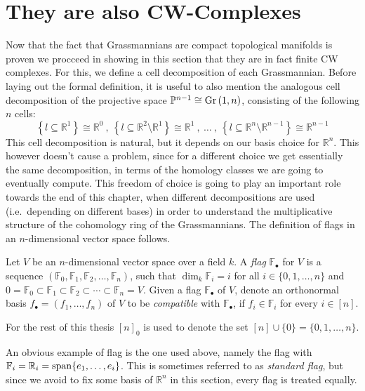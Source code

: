 \section{They are also CW-Complexes}
Now that the fact that Grassmannians are compact topological manifolds is proven we procceed in showing in this section that they are in fact finite CW complexes.
For this, we define a cell decomposition of each Grassmannian. Before laying out the formal definition, it is useful to also mention the analogous cell decomposition of the projective space $\mathbb{P}^{n-1}\cong\Gr{1}{n}$, consisting of the following $n$ cells:
\[\left\{l\subseteq\mathbb{R}^1\right\}\cong\mathbb{R}^0\ ,\ \left\{l\subseteq\mathbb{R}^2\setminus\mathbb{R}^1\right\}\cong\mathbb{R}^1\ ,\ \ldots\ ,\ \left\{l\subseteq\mathbb{R}^n\setminus\mathbb{R}^{n-1}\right\}\cong\mathbb{R}^{n-1}\]
This cell decomposition is natural, but it depends on our basis choice for $\mathbb{R}^n$. This however doesn't cause a problem, since for a different choice we get essentially the same decomposition, in terms of the homology classes we are going to eventually compute. This freedom of choice is going to play an important role towards the end of this chapter, when different decompositions are used (i.e.\ depending on different bases) in order to understand the multiplicative structure of the cohomology ring of the Grassmannians. The definition of flags in an $n$-dimensional vector space follows.

\begin{definition} Let $V$ be an $n$-dimensional vector space over a field $k$. A \emph{flag} $\mathbb{F}_{\bullet}$ for $V$ is a sequence $\left(\mathbb{F}_0,\mathbb{F}_1,\mathbb{F}_2,\ldots,\mathbb{F}_n\right)$, such that $\dim_k\mathbb{F}_i = i$ for all $i\in\{0,1,\ldots,n\}$ and
$0=\mathbb{F}_0\subset\mathbb{F}_1\subset\mathbb{F}_2\subset\cdots\subset\mathbb{F}_n=V$.
Given a flag $\mathbb{F}_{\bullet}$ of $V$, denote an orthonormal basis $f_{\bullet}=(f_1,\ldots,f_n)$ of $V$ to be \emph{compatible} with $\mathbb{F}_{\bullet}$, if
$f_i\in\mathbb{F}_i$
for every $i\in[n]$.
\end{definition}
For the rest of this thesis ${[n]}_0$ is used to denote the set $[n]\cup\{0\}=\{0,1,\ldots,n\}$.

An obvious example of flag is the one used above, namely the flag with $\mathbb{F}_i=\mathbb{R}_i=\mathrm{span}\{e_1,\ldots,e_i\}$. This is sometimes referred to as \emph{standard flag}, but since we avoid to fix some basis of $\mathbb{R}^n$ in this section, every flag is treated equally.

